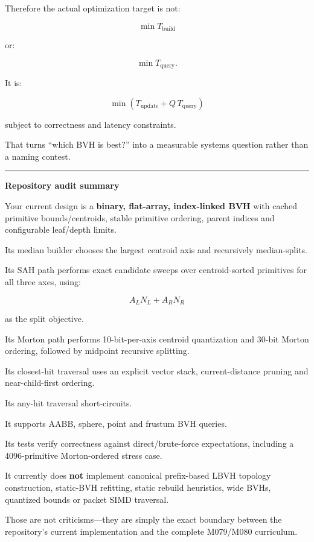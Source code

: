 Therefore the actual optimization target is not:

\[
\min T_{\text{build}}
\]

or:

\[
\min T_{\text{query}}.
\]

It is:

\[
\boxed{
\min
\left(
T_{\text{update}}
+
Q\,T_{\text{query}}
\right)
}
\]

subject to correctness and latency constraints.

That turns ``which BVH is best?'' into a measurable systems question rather than a naming contest.

\begin{center}\rule{0.5\linewidth}{0.5pt}\end{center}

\textbf{Repository audit summary}

Your current  design is a \textbf{binary, flat-array, index-linked BVH} with cached primitive bounds/centroids, stable primitive ordering, parent indices and configurable leaf/depth limits.

Its median builder chooses the largest centroid axis and recursively median-splits.

Its SAH path performs exact candidate sweeps over centroid-sorted primitives for all three axes, using:

\[
A_LN_L+A_RN_R
\]

as the split objective.

Its Morton path performs 10-bit-per-axis centroid quantization and 30-bit Morton ordering, followed by midpoint recursive splitting.

Its closest-hit traversal uses an explicit vector stack, current-distance pruning and near-child-first ordering.

Its any-hit traversal short-circuits.

It supports AABB, sphere, point and frustum BVH queries.

Its tests verify correctness against direct/brute-force expectations, including a 4096-primitive Morton-ordered stress case.

It currently does \textbf{not} implement canonical prefix-based LBVH topology construction, static-BVH refitting, static rebuild heuristics, wide BVHs, quantized bounds or packet SIMD traversal.

Those are not criticisms---they are simply the exact boundary between the repository's current implementation and the complete M079/M080 curriculum.

